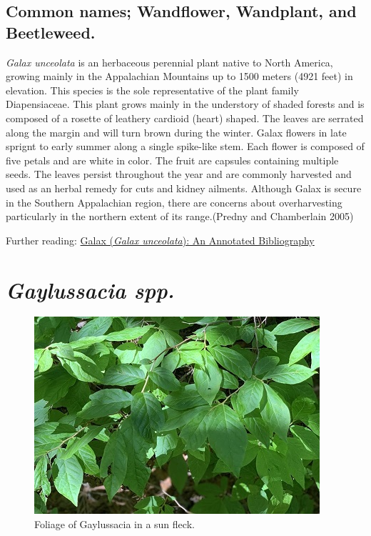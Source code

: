 \documentclass[
]{article}
\begin{document}
\hypertarget{common-names-wandflower-wandplant-and-beetleweed.}{%
\subsection{Common names; Wandflower, Wandplant, and Beetleweed.}\label{common-names-wandflower-wandplant-and-beetleweed.}}

\emph{Galax unceolata} is an herbaceous perennial plant native to North America, growing mainly in the Appalachian Mountains up to 1500 meters (4921 feet) in elevation. This species is the sole representative of the plant family Diapensiaceae. This plant grows mainly in the understory of shaded forests and is composed of a rosette of leathery cardioid (heart) shaped. The leaves are serrated along the margin and will turn brown during the winter. Galax flowers in late sprignt to early summer along a single spike-like stem. Each flower is composed of five petals and are white in color. The fruit are capsules containing multiple seeds. The leaves persist throughout the year and are commonly harvested and used as an herbal remedy for cuts and kidney ailments. Although Galax is secure in the Southern Appalachian region, there are concerns about overharvesting particularly in the northern extent of its range.(Predny and Chamberlain 2005)

Further reading: \href{https://www.srs.fs.usda.gov/pubs/gtr/gtr_srs087.pdf}{Galax (\emph{Galax unceolata}): An Annotated Bibliography}

\hypertarget{gaylussacia-spp.}{%
\section{\texorpdfstring{\emph{Gaylussacia spp.}}{Gaylussacia spp.}}\label{gaylussacia-spp.}}

\begin{figure}

{\centering \includegraphics[width=0.5\linewidth]{galuss} 

}

\caption{Foliage of Gaylussacia in a sun fleck.}\label{fig:gayluss}
\end{figure}
\end{document}

